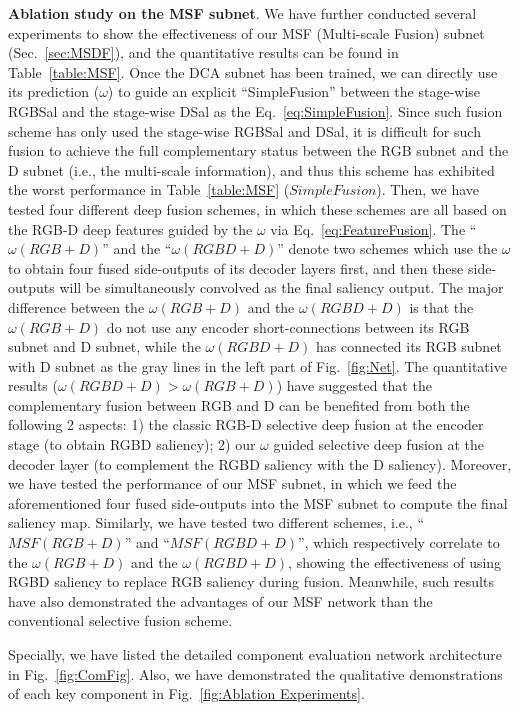 \documentclass[journal]{IEEEtran}
\begin{document}
\textbf{Ablation study on the MSF subnet}.
We have further conducted several experiments to show the effectiveness of our MSF (Multi-scale Fusion) subnet (Sec.~\ref{sec:MSDF}), and the quantitative results can be found in Table~\ref{table:MSF}.
Once the DCA subnet has been trained, we can directly use its prediction ($\omega$) to guide an explicit ``SimpleFusion'' between the stage-wise RGBSal and the stage-wise DSal as the Eq.~\ref{eq:SimpleFusion}.
Since such fusion scheme has only used the stage-wise RGBSal and DSal, it is difficult for such fusion to achieve the full complementary status between the RGB subnet and the D subnet (i.e., the multi-scale information), and thus this scheme has exhibited the worst performance in Table~\ref{table:MSF} ($SimpleFusion$).
Then, we have tested four different deep fusion schemes, in which these schemes are all based on the RGB-D deep features guided by the $\omega$ via Eq.~\ref{eq:FeatureFusion}.
The ``$\omega(RGB+D)$'' and the ``$\omega(RGBD+D)$'' denote two schemes which use the $\omega$ to obtain four fused side-outputs of its decoder layers first, and then these side-outputs will be simultaneously convolved as the final saliency output.
The major difference between the $\omega(RGB+D)$ and the $\omega(RGBD+D)$ is that the $\omega(RGB+D)$ do not use any encoder short-connections between its RGB subnet and D subnet, while the $\omega(RGBD+D)$ has connected its RGB subnet with D subnet as the gray lines in the left part of Fig.~\ref{fig:Net}.
The quantitative results ($\omega(RGBD+D)$$>$$\omega(RGB+D)$) have suggested that the complementary fusion between RGB and D can be benefited from both the following 2 aspects: 1) the classic RGB-D selective deep fusion at the encoder stage (to obtain RGBD saliency); 2) our $\omega$ guided selective deep fusion at the decoder layer (to complement the RGBD saliency with the D saliency).
Moreover, we have tested the performance of our MSF subnet, in which we feed the aforementioned four fused side-outputs into the MSF subnet to compute the final saliency map.
Similarly, we have tested two different schemes, i.e., ``$MSF(RGB+D)$'' and ``$MSF(RGBD+D)$'', which respectively correlate to the $\omega(RGB+D)$ and the $\omega(RGBD+D)$, showing the effectiveness of using RGBD saliency to replace RGB saliency during fusion.
Meanwhile, such results have also demonstrated the advantages of our MSF network than the conventional selective fusion scheme.

Specially, we have listed the detailed component evaluation network architecture in Fig.~\ref{fig:ComFig}.
Also, we have demonstrated the qualitative demonstrations of each key component in Fig.~\ref{fig:Ablation Experiments}.
\end{document}
